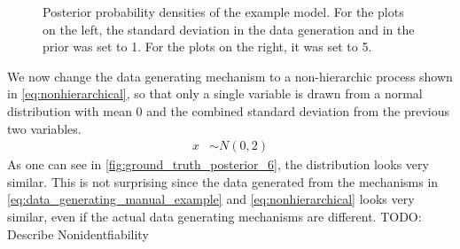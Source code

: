\documentclass{article}
\begin{document}
\begin{figure}
\begin{minipage}{0.5\linewidth}
	\end{minipage}
\caption[Posterior probability densities of the example model for different standard deviations]{Posterior probability densities of the example model. For the plots on the left, the standard deviation in the data generation and in the prior was set to 1. For the plots on the right, it was set to 5.}
\label{fig:ground_truth_posterior_34}
\end{figure}
We now change the data generating mechanism to a non-hierarchic process shown in \autoref{eq:nonhierarchical}, so that only a single variable is drawn from a normal distribution with mean 0 and the combined standard deviation from the previous two variables.
\begin{equation}
\label{eq:nonhierarchical}
\begin{split}
x &\sim N(0,2)
\end{split}
\end{equation}
As one can see in \autoref{fig:ground_truth_posterior_6}, the distribution looks very similar. This is not surprising since the data generated from the mechanisms in \autoref{eq:data_generating_manual_example} and \autoref{eq:nonhierarchical} looks very similar, even if the actual data generating mechanisms are different. TODO: Describe Nonidentfiability
\end{document}
